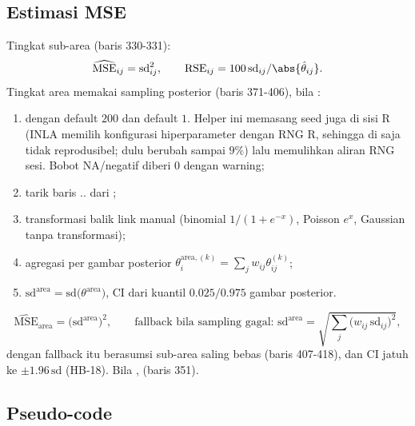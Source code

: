 \subsection{Estimasi MSE}\label{sec:hbtwofold-mse}

Tingkat sub-area (baris 330-331):
\begin{equation}
  \widehat{\mathrm{MSE}}_{ij}=\mathrm{sd}_{ij}^2,\qquad
  \mathrm{RSE}_{ij}=100\,\mathrm{sd}_{ij}/\abs{\hat\theta_{ij}}.
  \label{eq:hbtwofold-mse-sub}
\end{equation}
Tingkat area memakai sampling posterior (baris 371-406), bila
:
\begin{enumerate}[label=\arabic*.]
  \item {} dengan
         default $200$ dan  default
        $1$. Helper ini memasang seed juga di sisi R (INLA memilih konfigurasi
        hiperparameter dengan RNG R, sehingga  di
         saja tidak reprodusibel; dulu
         berubah sampai $9\%$) lalu memulihkan aliran RNG sesi.
        Bobot NA/negatif diberi 0 dengan warning;
  \item tarik baris ..
        dari ;
  \item transformasi balik link manual (binomial $1/(1+e^{-x})$, Poisson
        $e^{x}$, Gaussian tanpa transformasi);
  \item agregasi per gambar posterior
        $\theta^{\text{area},(k)}_i=\sum_j w_{ij}\theta^{(k)}_{ij}$;
  \item $\mathrm{sd}^{\text{area}}=\mathrm{sd}\bigl(\theta^{\text{area}}\bigr)$,
        CI dari kuantil $0.025/0.975$ gambar posterior.
\end{enumerate}
\begin{equation}
  \widehat{\mathrm{MSE}}_{\text{area}}=\bigl(\mathrm{sd}^{\text{area}}\bigr)^2,
  \qquad
  \text{fallback bila sampling gagal: }
  \mathrm{sd}^{\text{area}}=\sqrt{\textstyle\sum_j\bigl(w_{ij}\,
  \mathrm{sd}_{ij}\bigr)^2},
  \label{eq:hbtwofold-mse-area}
\end{equation}
dengan fallback itu berasumsi sub-area saling bebas (baris 407-418), dan CI
jatuh ke $\pm1.96\,\mathrm{sd}$ (HB-18). Bila ,
 (baris 351).

\subsection{Pseudo-code}\label{sec:hbtwofold-algo}

